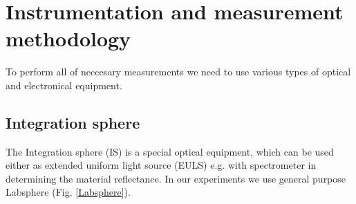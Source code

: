 
\chapter{Instrumentation and measurement methodology}
To perform all of neccesary measurements we need to use various types of optical and electronical equipment.
\section{Integration sphere}
The Integration sphere (IS) is a special optical equipment, which can be used either as extended uniform light source (EULS) e.g. with spectrometer in determining the material reflectance. In our experiments we use general purpose Labsphere (Fig. \ref{Labsphere}).

